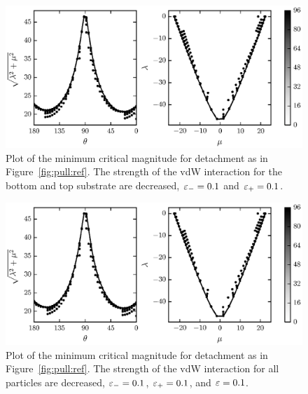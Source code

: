{   \begin{figure}[t]
      \begin{center}
         \includegraphics{./fig/ch3/pull/eb0.1_et0.1/grid.eps}
      \end{center}      
      \caption{Plot of the minimum critical magnitude for detachment as in Figure~\ref{fig:pull:ref}. The strength of the vdW interaction for the bottom and top substrate are decreased, $\varepsilon_-=0.1$ and $\varepsilon_+=0.1$.
      \label{fig:pull:eb0.1_et0.1}}
   \end{figure}
   
   \begin{figure}[t]
      \begin{center}
         \includegraphics{./fig/ch3/pull/eb0.1_et0.1_e0.1/grid.eps}
      \end{center}      
      \caption{Plot of the minimum critical magnitude for detachment as in Figure~\ref{fig:pull:ref}. The strength of the vdW interaction for all particles are decreased, $\varepsilon_-=0.1$, $\varepsilon_+=0.1$, and $\varepsilon=0.1$.
      \label{fig:pull:eb0.1_et0.1_e0.1}}
   \end{figure}

}
